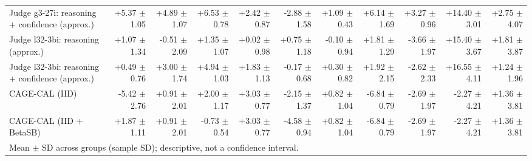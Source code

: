 \begin{tabular}{lrrrrrrrrrr}
Judge g3-27i: reasoning + confidence (approx.) & +5.37 {\scriptsize $\pm$ 1.05} & +4.89 {\scriptsize $\pm$ 1.07} & +6.53 {\scriptsize $\pm$ 0.78} & +2.42 {\scriptsize $\pm$ 0.87} & -2.88 {\scriptsize $\pm$ 1.58} & +1.09 {\scriptsize $\pm$ 0.43} & +6.14 {\scriptsize $\pm$ 1.69} & +3.27 {\scriptsize $\pm$ 0.96} & +14.40 {\scriptsize $\pm$ 3.01} & +2.75 {\scriptsize $\pm$ 4.07} \\
Judge l32-3bi: reasoning (approx.) & +1.07 {\scriptsize $\pm$ 1.34} & -0.51 {\scriptsize $\pm$ 2.09} & +1.35 {\scriptsize $\pm$ 1.07} & +0.02 {\scriptsize $\pm$ 0.98} & +0.75 {\scriptsize $\pm$ 1.18} & -0.10 {\scriptsize $\pm$ 0.94} & +1.81 {\scriptsize $\pm$ 1.29} & -3.66 {\scriptsize $\pm$ 1.97} & +15.40 {\scriptsize $\pm$ 3.67} & +1.81 {\scriptsize $\pm$ 3.87} \\
Judge l32-3bi: reasoning + confidence (approx.) & +0.49 {\scriptsize $\pm$ 0.76} & +3.00 {\scriptsize $\pm$ 1.74} & +4.94 {\scriptsize $\pm$ 1.03} & +1.83 {\scriptsize $\pm$ 1.13} & -0.17 {\scriptsize $\pm$ 0.68} & +0.30 {\scriptsize $\pm$ 0.82} & +1.92 {\scriptsize $\pm$ 2.15} & -2.62 {\scriptsize $\pm$ 2.33} & +16.55 {\scriptsize $\pm$ 4.11} & +1.24 {\scriptsize $\pm$ 1.96} \\
CAGE-CAL (IID) & -5.42 {\scriptsize $\pm$ 2.76} & +0.91 {\scriptsize $\pm$ 2.01} & +2.00 {\scriptsize $\pm$ 1.17} & +3.03 {\scriptsize $\pm$ 0.77} & -2.15 {\scriptsize $\pm$ 1.37} & +0.82 {\scriptsize $\pm$ 1.04} & -6.84 {\scriptsize $\pm$ 0.79} & -2.69 {\scriptsize $\pm$ 1.97} & -2.27 {\scriptsize $\pm$ 4.21} & +1.36 {\scriptsize $\pm$ 3.81} \\
CAGE-CAL (IID + BetaSB) & +1.87 {\scriptsize $\pm$ 1.11} & +0.91 {\scriptsize $\pm$ 2.01} & -0.73 {\scriptsize $\pm$ 0.54} & +3.03 {\scriptsize $\pm$ 0.77} & -4.58 {\scriptsize $\pm$ 0.94} & +0.82 {\scriptsize $\pm$ 1.04} & -6.84 {\scriptsize $\pm$ 0.79} & -2.69 {\scriptsize $\pm$ 1.97} & -2.27 {\scriptsize $\pm$ 4.21} & +1.36 {\scriptsize $\pm$ 3.81} \\
\bottomrule
\multicolumn{11}{l}{\scriptsize Mean $\pm$ SD across groups (sample SD); descriptive, not a confidence interval.} \\
\end{tabular}
